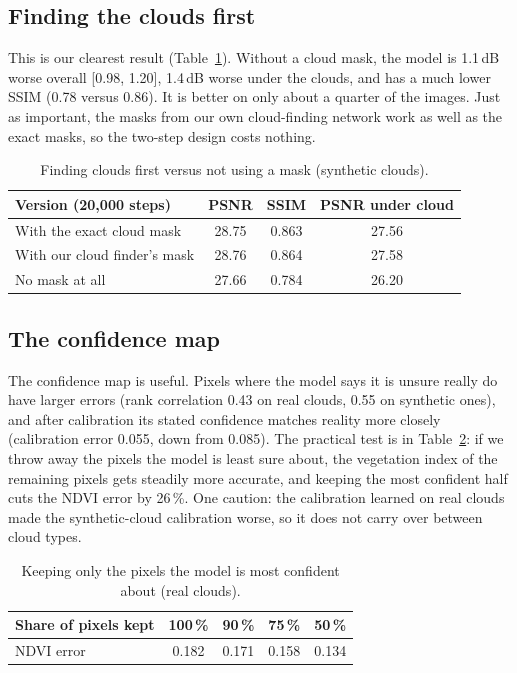 \documentclass[conference]{IEEEtran}
\begin{document}
\subsection{Finding the clouds first}
This is our clearest result (Table~\ref{tab:c5}). Without a cloud mask, the model is 1.1\,dB
worse overall [0.98, 1.20], 1.4\,dB worse under the clouds, and has a much lower SSIM (0.78 versus
0.86). It is better on only about a quarter of the images. Just as important, the masks from our
own cloud-finding network work as well as the exact masks, so the two-step design costs nothing.

\begin{table}[t]
\centering
\caption{Finding clouds first versus not using a mask (synthetic clouds).}
\label{tab:c5}
\setlength{\tabcolsep}{4pt}
\begin{tabular}{lccc}
\toprule
Version (20,000 steps) & PSNR & SSIM & PSNR under cloud \\
\midrule
With the exact cloud mask & 28.75 & 0.863 & 27.56 \\
With our cloud finder's mask & 28.76 & 0.864 & 27.58 \\
No mask at all & 27.66 & 0.784 & 26.20 \\
\bottomrule
\end{tabular}
\end{table}

\subsection{The confidence map}
The confidence map is useful. Pixels where the model says it is unsure really do have larger
errors (rank correlation 0.43 on real clouds, 0.55 on synthetic ones), and after calibration its
stated confidence matches reality more closely (calibration error 0.055, down from 0.085). The
practical test is in Table~\ref{tab:unc}: if we throw away the pixels the model is least sure
about, the vegetation index of the remaining pixels gets steadily more accurate, and keeping the
most confident half cuts the NDVI error by 26\,\%. One caution: the calibration learned on real
clouds made the synthetic-cloud calibration worse, so it does not carry over between cloud types.

\begin{table}[t]
\centering
\caption{Keeping only the pixels the model is most confident about (real clouds).}
\label{tab:unc}
\begin{tabular}{lcccc}
\toprule
Share of pixels kept & 100\,\% & 90\,\% & 75\,\% & 50\,\% \\
\midrule
NDVI error & 0.182 & 0.171 & 0.158 & 0.134 \\
\bottomrule
\end{tabular}
\end{table}
\end{document}

